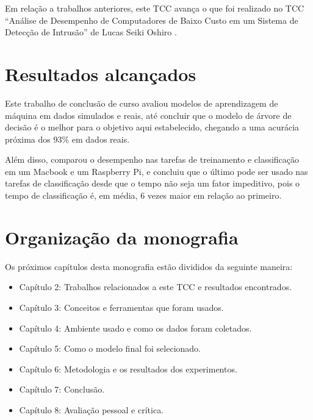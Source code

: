 Em relação a trabalhos anteriores, este TCC avança o que foi realizado no TCC “Análise de Desempenho de Computadores de Baixo Custo em um Sistema de 
Detecção de Intrusão” de Lucas Seiki Oshiro \citep{tcc:lucas}.

\section{Resultados alcançados}

Este trabalho de conclusão de curso avaliou modelos de aprendizagem de máquina em dados simulados e 
reais, até concluir que o modelo de árvore de decisão é o melhor para o objetivo aqui estabelecido, 
chegando a uma acurácia próxima dos 93\% em dados reais.

Além disso, comparou o desempenho nas tarefas de treinamento e classificação em um Macbook e um 
Raspberry Pi, e concluiu que o último pode ser usado nas tarefas de classificação desde que o tempo
não seja um fator impeditivo, pois o tempo de classificação é, em média, 6 vezes maior em relação ao primeiro.

\section{Organização da monografia}

Os próximos capítulos desta monografia estão divididos da seguinte maneira: 

\begin{itemize}
    \item Capítulo 2: Trabalhos relacionados a este TCC e resultados encontrados.
    \item Capítulo 3: Conceitos e ferramentas que foram usados.
    \item Capítulo 4: Ambiente usado e como os dados foram coletados.
    \item Capítulo 5: Como o modelo final foi selecionado.
    \item Capítulo 6: Metodologia e os resultados dos experimentos.
    \item Capítulo 7: Conclusão.
    \item Capítulo 8: Avaliação pessoal e crítica.
\end{itemize}